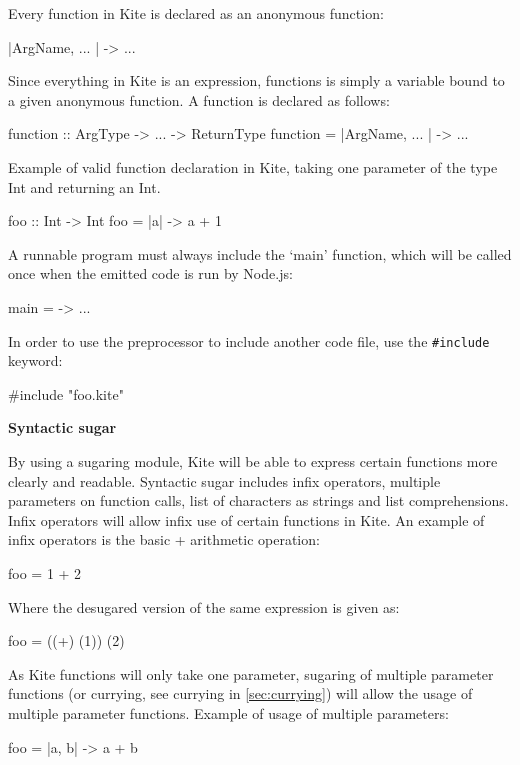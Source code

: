 Every function in Kite is declared as an anonymous function:
\begin{kite}
  
|ArgName, ... | -> { ... }
\end{kite}

Since everything in Kite is an expression, functions is simply a
variable bound to a given anonymous function. A function is declared
as follows:
\begin{kite}
  
  function :: ArgType -> ... -> ReturnType
  function = |ArgName, ... | -> { ... }
\end{kite}
Example of valid function declaration in Kite, taking one parameter of
the type Int and returning an Int.
\begin{kite}
  
  foo :: Int -> Int
  foo = |a| -> {
    a + 1
  }
\end{kite}
A runnable program must always include the `main' function, which will be called once when the emitted code is run by Node.js:
\begin{kite}
  
  main = -> { ... }
\end{kite}

In order to use the preprocessor to include another code file, use the \texttt{\#include} keyword:
\begin{kite}
  
  #include "foo.kite"
\end{kite}

\textbf{Syntactic sugar}

By using a sugaring module, Kite will be able to express certain
functions more clearly and readable. Syntactic sugar includes infix
operators, multiple parameters on function calls, list of characters
as strings and list comprehensions.
Infix operators will allow infix use of certain functions in Kite. An
example of infix operators is the basic + arithmetic operation:
\begin{kite}
  
  foo = 1 + 2
\end{kite}

Where the desugared version of the same expression is given as:

\begin{kite}

  foo = ((+) (1)) (2)
\end{kite}

As Kite functions will only take one parameter, sugaring of multiple
parameter functions (or currying, see currying in \ref{sec:currying})
will allow the usage of multiple parameter functions. Example of usage
of multiple parameters:
\begin{kite}
  
  foo = |a, b| -> {
    a + b
  }
\end{kite}

